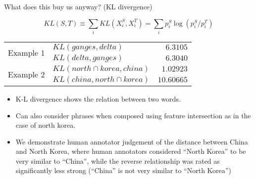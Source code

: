 \documentclass[8pt]{beamer}
\begin{document}
\begin{frame}{What does this buy us anyway? (KL divergence)}


\begin{equation*}
     KL(S, T) \equiv \sum_i KL(X^S_i, X^T_i) =  \sum_i p^S_i \log \left( p^S_i / p^T_i \right)
\end{equation*}


\begin{tabular}{clr}
    \multirow{2}{*}{Example 1} & $KL(ganges, delta)$ & $6.3105$  \\
                               & $KL(delta, ganges)$ & $6.3040$  \\
    \multirow{2}{*}{Example 2} & $KL(north \cap korea, china)$ & $1.02923$ \\
                               & $KL(china, north \cap korea)$ & $10.60665$
\end{tabular}

\begin{itemize}
\item  K-L divergence shows the relation
between two words.
\item Can also consider phrases when composed using feature intersection as in the case of
north korea.
\item We demonstrate human annotator judgement of the distance between China
and North Korea, where human annotators considered ``North Korea'' to be very similar to
``China'', while the reverse relationship was rated as significantly less strong (``China'' is not
very similar to ``North Korea'')
\end{itemize}
\end{frame}
\end{document}
